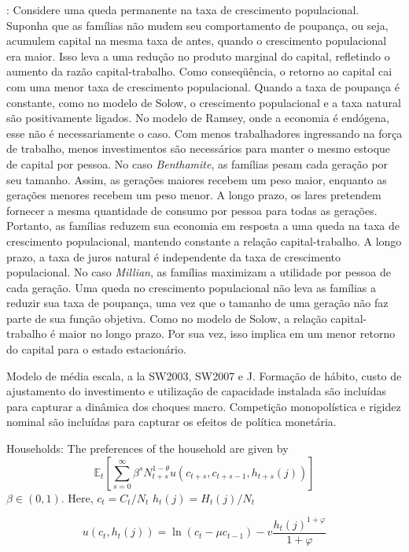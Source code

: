 : Considere uma queda permanente na taxa de crescimento populacional. Suponha que as famílias não mudem seu comportamento de poupança, ou seja, acumulem capital na mesma taxa de antes, quando o crescimento populacional era maior. Isso leva a uma redução no produto marginal do capital, refletindo o aumento da razão capital-trabalho. Como conseqüência, o retorno ao capital cai com uma menor taxa de crescimento populacional. Quando a taxa de poupança é constante, como no modelo de Solow, o crescimento populacional e a taxa natural são positivamente ligados. No modelo de Ramsey, onde a economia é endógena, esse não é necessariamente o caso. Com menos trabalhadores ingressando na força de trabalho, menos investimentos são necessários para manter o mesmo estoque de capital por pessoa. No caso \textit{Benthamite}, as famílias pesam cada geração por seu tamanho. Assim, as gerações maiores recebem um peso maior, enquanto as gerações menores recebem um peso menor. A longo prazo, os lares pretendem fornecer a mesma quantidade de consumo por pessoa para todas as gerações. Portanto, as famílias reduzem sua economia em resposta a uma queda na taxa de crescimento populacional, mantendo constante a relação capital-trabalho. A longo prazo, a taxa de juros natural é independente da taxa de crescimento populacional. No caso \textit{Millian}, as famílias maximizam a utilidade por pessoa de cada geração. Uma queda no crescimento populacional não leva as famílias a reduzir sua taxa de poupança, uma vez que o tamanho de uma geração não faz parte de sua função objetiva. Como no modelo de Solow, a relação capital-trabalho é maior no longo prazo. Por sua vez, isso implica em um menor retorno do capital para o estado estacionário.

Modelo de média escala, a la SW2003, SW2007 e J\citet{Justiniano:2010}. Formação de hábito, custo de ajustamento do investimento e utilização de capacidade instalada são incluídas para capturar a dinâmica dos choques macro. Competição monopolística e rigidez nominal são incluídas para capturar os efeitos de política monetária. 

Households: 
The preferences of the household are given by
$$
\mathbb{E}_{t}\left[\sum_{s=0}^{\infty} \beta^{s} N_{t+s}^{1-\theta} u\left(c_{t+s}, c_{t+s-1}, h_{t+s}(j)\right)\right]
$$
$\beta \in(0,1) .$ Here, $c_{t}=C_{t} / N_{t}$  $h_{t}(j)=H_{t}(j) / N_{t}$ 

$$
u\left(c_{t}, h_{t}(j)\right)=\ln \left(c_{t}-\mu c_{t-1}\right)-v \frac{h_{t}(j)^{1+\varphi}}{1+\varphi}
$$

